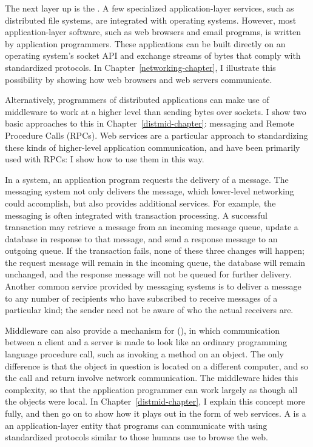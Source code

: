 The next layer up is the .  A few specialized
application-layer services, such as distributed file systems, are
integrated with operating systems.  However, most application-layer
software, such as web browsers and email programs, is written by
application programmers.  These applications can be built directly on
an operating system's socket API and exchange streams of bytes that
comply with standardized protocols.  In
Chapter~\ref{networking-chapter}, I illustrate this possibility by
showing how web browsers and web servers communicate.

Alternatively, programmers of distributed applications can make use of
middleware to work at a higher level than sending bytes over sockets.
I show two basic approaches to this in Chapter~\ref{distmid-chapter}:
messaging and Remote Procedure Calls (RPCs).  Web services are a particular
approach to standardizing these kinds of higher-level application
communication, and have been primarily used with RPCs:
I show how to use them in this way.

In a  system, an application program requests the
delivery of a message.  The messaging system not only delivers the
message, which lower-level networking could accomplish, but also
provides additional services.  For example, the messaging is often
integrated with transaction processing.  A successful transaction may
retrieve a message from an incoming message queue, update a database in
response to that message, and send a response message to an outgoing
queue.  If the transaction fails, none of these three changes will
happen; the request message will remain in the incoming queue, the
database will remain unchanged, and the response message will not be
queued for further delivery.  Another common service provided by
messaging systems is to deliver a message to any number of recipients
who have subscribed to receive messages of a particular kind;  the
sender need not be aware of who the actual receivers are.

Middleware can also provide a mechanism for  (), in which communication between a client and a
server is made to look like an ordinary programming language procedure
call, such as invoking a method on an object.  The only difference is
that the object in question is located on a different computer, and so
the call and return involve network communication.  The middleware
hides this complexity, so that the application programmer can work
largely as though all the objects were local.  In
Chapter~\ref{distmid-chapter}, I explain this concept more fully, and then go
on to show how it plays out in the form of web services.  A  is a an application-layer entity that programs can
communicate with using standardized protocols similar to those humans
use to browse the web.

